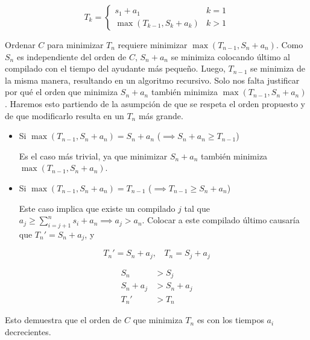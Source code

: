 $$
T_{k} = \begin{cases}
s_{1}+a_{1} & k=1 \\
\displaystyle\max{(T_{k-1},S_{k}+a_{k})} & k>1
\end{cases}
$$

Ordenar $C$ para minimizar $T_{n}$ requiere minimizar $\max{(T_{n-1},S_{n}+a_{n})}$. Como $S_{n}$ es independiente del orden de $C$, $S_{n}+a_{n}$ se minimiza colocando último al compilado con el tiempo del ayudante más pequeño. Luego, $T_{n-1}$ se minimiza de la misma manera, resultando en un algoritmo recursivo. Solo nos falta justificar por qué el orden que minimiza $S_{n}+a_{n}$ también minimiza $\max{(T_{n-1},S_{n}+a_{n})}$. Haremos esto partiendo de la asumpción de que se respeta el orden propuesto y de que modificarlo resulta en un $T_n$ más grande.

\begin{itemize}

    \item Si $\max{(T_{n-1},S_{n}+a_{n})} = S_{n}+a_{n}$ ($\implies S_{n}+a_{n} \geq T_{n-1}$)

    Es el caso más trivial, ya que minimizar $S_{n}+a_{n}$ también minimiza $\max{(T_{n-1},S_{n}+a_{n})}$.

    \item Si $\max{(T_{n-1},S_{n}+a_{n})} = T_{n-1}$ ($\implies T_{n-1} \geq S_{n}+a_{n}$)

    Este caso implica que existe un compilado $j$ tal que $a_{j} \geq \sum^{n}_{i=j+1}s_{i}+a_{n} \implies a_{j} > a_{n}$.
    Colocar a este compilado último causaría que $T_{n}'= S_{n}+a_{j}$, y

\end{itemize}

$$
T_{n}' = S_{n}+a_{j}, \ \ \ \  T_{n} = S_{j}+a_{j} 
$$

$$
\begin{aligned}
S_{n} & > S_{j} \\
S_{n} + a_{j}  & > S_{n} + a_{j}  \\
T_{n}' & > T_{n}
\end{aligned}
$$

Esto demuestra que el orden de $C$ que minimiza $T_n$ es con los tiempos $a_i$ decrecientes.




